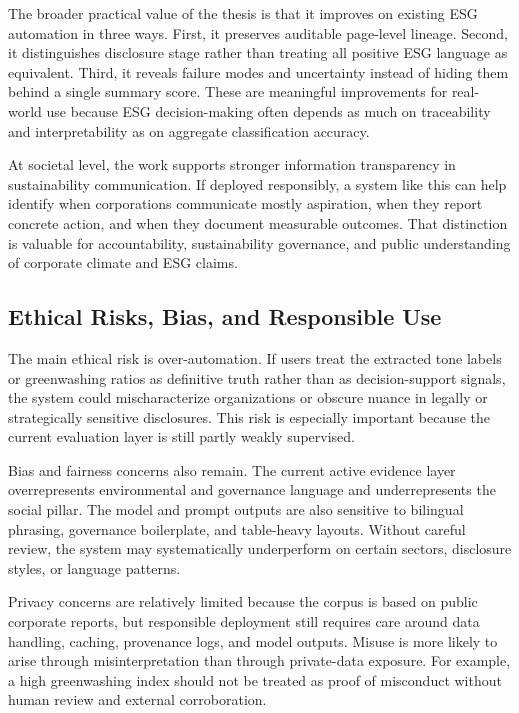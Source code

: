 The broader practical value of the thesis is that it improves on existing ESG automation in three ways. First, it preserves auditable page-level lineage. Second, it distinguishes disclosure stage rather than treating all positive ESG language as equivalent. Third, it reveals failure modes and uncertainty instead of hiding them behind a single summary score. These are meaningful improvements for real-world use because ESG decision-making often depends as much on traceability and interpretability as on aggregate classification accuracy.

At societal level, the work supports stronger information transparency in sustainability communication. If deployed responsibly, a system like this can help identify when corporations communicate mostly aspiration, when they report concrete action, and when they document measurable outcomes. That distinction is valuable for accountability, sustainability governance, and public understanding of corporate climate and ESG claims.

\subsection{Ethical Risks, Bias, and Responsible Use}

The main ethical risk is over-automation. If users treat the extracted tone labels or greenwashing ratios as definitive truth rather than as decision-support signals, the system could mischaracterize organizations or obscure nuance in legally or strategically sensitive disclosures. This risk is especially important because the current evaluation layer is still partly weakly supervised.

Bias and fairness concerns also remain. The current active evidence layer overrepresents environmental and governance language and underrepresents the social pillar. The model and prompt outputs are also sensitive to bilingual phrasing, governance boilerplate, and table-heavy layouts. Without careful review, the system may systematically underperform on certain sectors, disclosure styles, or language patterns.

Privacy concerns are relatively limited because the corpus is based on public corporate reports, but responsible deployment still requires care around data handling, caching, provenance logs, and model outputs. Misuse is more likely to arise through misinterpretation than through private-data exposure. For example, a high greenwashing index should not be treated as proof of misconduct without human review and external corroboration.

